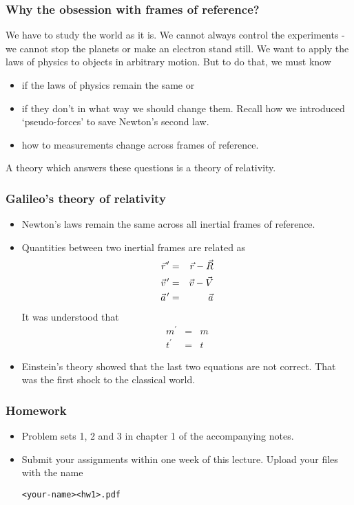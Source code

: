 \documentclass{beamer}
\newcommand{\pvec}[1]{\vec{#1}\mkern2mu\vphantom{#1}}
\begin{document}
\begin{frame}
\frametitle{Why the obsession with frames of reference?}
We have to study the world as it is. We cannot always control the experiments -
we cannot stop the planets or make an electron stand still. We want to apply
the laws of physics to objects in arbitrary motion. But to do that, we must 
know 
\begin{itemize}
\item if the laws of physics remain the same or
\item if they don't in what way we should change them. Recall how we introduced
`pseudo-forces' to save Newton's second law.
\item how to measurements change across frames of reference. 
\end{itemize}
A theory which answers these questions is a theory of relativity.
\end{frame}

\begin{frame}
\frametitle{Galileo's theory of relativity}
\begin{itemize}
\item Newton's laws remain the same across all inertial frames of reference.
\item Quantities between two inertial frames are related as
\begin{eqnarray}
\pvec{r}^\prime &=& \vec{r} - \vec{R} \label{4} \\
\pvec{v}^\prime &=& \vec{v} - \vec{V} \label{5} \\
\pvec{a}^\prime &=& \vec{a}           \label{6} 
\end{eqnarray}
It was understood that 
\begin{eqnarray}
m^\prime &=& m \label{e7} \\
t^\prime &=& t \label{e8}
\end{eqnarray}
\item Einstein's theory showed that the last two equations are not correct. 
That was the first shock to the classical world.
\end{itemize}
\end{frame}

\begin{frame}[fragile]
\frametitle{Homework}
\begin{itemize}
\item Problem sets 1, 2 and 3 in chapter 1 of the accompanying notes.
\item Submit your assignments within one week of this lecture. Upload your 
files with the name \begin{verbatim}<your-name><hw1>.pdf\end{verbatim}
\end{itemize}
\end{frame}
\end{document}
